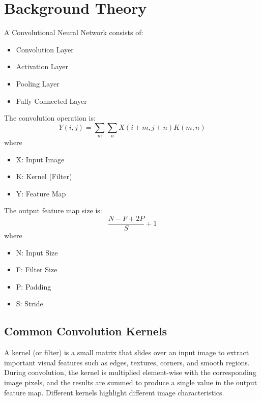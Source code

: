 \documentclass[11pt]{article}
\begin{document}
\section{Background Theory}
A Convolutional Neural Network consists of: 
\begin{itemize}
    \item Convolution Layer 
    \item Activation Layer 
    \item Pooling Layer 
    \item Fully Connected Layer 
\end{itemize}

The convolution operation is: 
\begin{equation}
    Y(i,j) = \sum_{m}\sum_{n}X(i+m,j+n)K(m,n)
\end{equation}
where 
\begin{itemize}
    \item X: Input Image 
    \item K: Kernel (Filter) 
    \item Y: Feature Map 
\end{itemize}

The output feature map size is: 
\begin{equation}
    \frac{N-F+2P}{S}+1
\end{equation}
where 
\begin{itemize}
    \item N: Input Size 
    \item F: Filter Size 
    \item P: Padding 
    \item S: Stride 
\end{itemize}

\subsection{Common Convolution Kernels}
A kernel (or filter) is a small matrix that slides over an input image to extract important visual features such as edges, textures, corners, and smooth regions.  During convolution, the kernel is multiplied element-wise with the corresponding image pixels, and the results are summed to produce a single value in the output feature map.  Different kernels highlight different image characteristics. 

\end{document}
